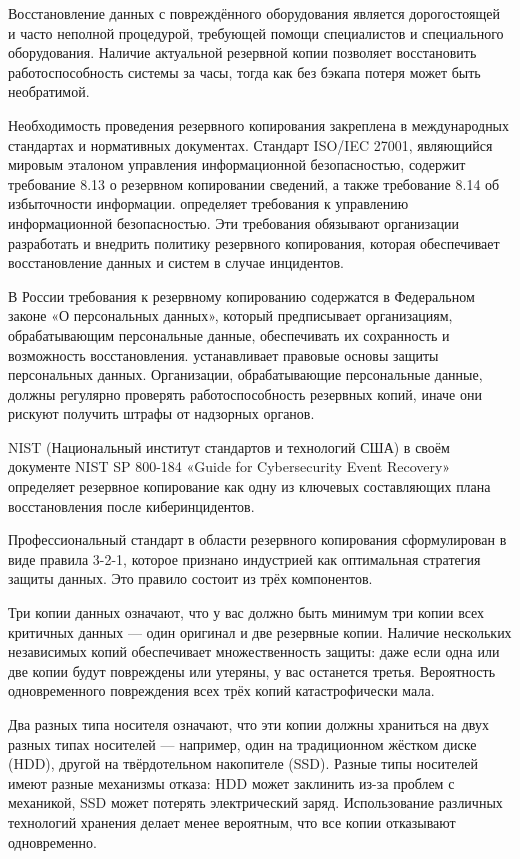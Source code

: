 \documentclass{SibFU-docs}
\begin{document}
Восстановление данных с повреждённого оборудования является дорогостоящей и часто неполной процедурой, требующей помощи специалистов и специального оборудования. Наличие актуальной резервной копии позволяет восстановить работоспособность системы за часы, тогда как без бэкапа потеря может быть необратимой.


Необходимость проведения резервного копирования закреплена в международных стандартах и нормативных документах. Стандарт ISO/IEC 27001, являющийся мировым эталоном управления информационной безопасностью, содержит требование 8.13 о резервном копировании сведений, а также требование 8.14 об избыточности информации. \cite{iso27001} определяет требования к управлению информационной безопасностью. Эти требования обязывают организации разработать и внедрить политику резервного копирования, которая обеспечивает восстановление данных и систем в случае инцидентов.

В России требования к резервному копированию содержатся в Федеральном законе «О персональных данных», который предписывает организациям, обрабатывающим персональные данные, обеспечивать их сохранность и возможность восстановления. \cite{personaldata} устанавливает правовые основы защиты персональных данных. Организации, обрабатывающие персональные данные, должны регулярно проверять работоспособность резервных копий, иначе они рискуют получить штрафы от надзорных органов.

NIST (Национальный институт стандартов и технологий США) в своём документе NIST SP 800-184 «Guide for Cybersecurity Event Recovery» определяет резервное копирование как одну из ключевых составляющих плана восстановления после киберинцидентов.


Профессиональный стандарт в области резервного копирования сформулирован в виде правила 3-2-1, которое признано индустрией как оптимальная стратегия защиты данных. Это правило состоит из трёх компонентов.

Три копии данных означают, что у вас должно быть минимум три копии всех критичных данных --- один оригинал и две резервные копии. Наличие нескольких независимых копий обеспечивает множественность защиты: даже если одна или две копии будут повреждены или утеряны, у вас останется третья. Вероятность одновременного повреждения всех трёх копий катастрофически мала.

Два разных типа носителя означают, что эти копии должны храниться на двух разных типах носителей --- например, один на традиционном жёстком диске (HDD), другой на твёрдотельном накопителе (SSD). Разные типы носителей имеют разные механизмы отказа: HDD может заклинить из-за проблем с механикой, SSD может потерять электрический заряд. Использование различных технологий хранения делает менее вероятным, что все копии отказывают одновременно.
\end{document}
